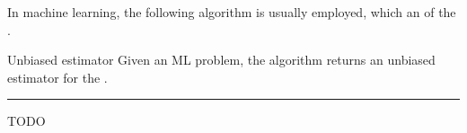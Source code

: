 \documentclass[a4paper, 12pt]{report}
\begin{document}
    In machine learning, the following algorithm is usually employed, which  an  of the .

    \begin{framedalgo}{Unbiased estimator}
        Given an ML problem, the algorithm returns an unbiased estimator for the . \\
        \hrule
        \quad
        \label{alg:unbiased_estimator}
        \begin{algorithmic}[1]
                \State TODO
            \EndFunction
        \end{algorithmic}
    \end{framedalgo}
\end{document}
